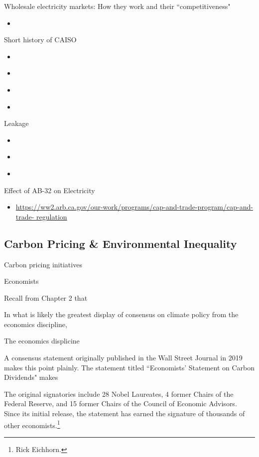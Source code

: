\noindent Wholesale electricity markets: How they work and their ``competitiveness"
\begin{itemize}
    \item \cite{ferc2020}
\end{itemize}

\noindent Short history of CAISO
\begin{itemize}
    \item \cite{sweeney2013california}
    \item \cite{knittel2005empirical}
    \item \cite{borenstein2000diagnosing}
    \item \cite{borenstein2015us}
\end{itemize}

\noindent Leakage
\begin{itemize}
    \item \cite{burtraw2018}
    \item \cite{fowlie2009incomplete}
    \item \cite{fowlie2021border}
\end{itemize}

\noindent Effect of AB-32 on Electricity
\begin{itemize}
    \item \url{https://ww2.arb.ca.gov/our-work/programs/cap-and-trade-program/cap-and-trade-
    regulation}
\end{itemize}

\subsection{Carbon Pricing \& Environmental Inequality}

Carbon pricing initiatives 


Economists 

Recall from Chapter 2 that 

In what is likely the greatest display of consensus on climate policy from the economics discipline, 

The economics displicine 

A consensus statement originally published in the Wall Street Journal in 2019 makes this point plainly. The statement titled ``Economists' Statement on Carbon Dividends" makes 



The original signatories include 28 Nobel Laureates, 4 former Chairs of the Federal Reserve, and 15 former Chairs of the Council of Economic Advisors. Since its initial release, the statement has earned the signature of thousands of other economists.\footnote{Rick Eichhorn.}

